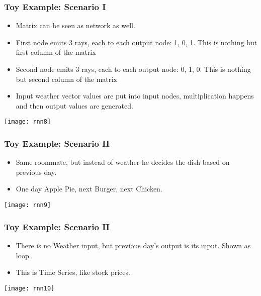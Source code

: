 \begin{frame}[fragile] \frametitle{Toy Example: Scenario I}
\begin{itemize}
\item Matrix can be seen as network as well.
\item First node emits 3 rays, each to each output node: 1, 0, 1. This is nothing but first column of the matrix
\item Second node emits 3 rays, each to each output node: 0, 1, 0. This is nothing but second column of the matrix
\item Input weather vector values are put into input nodes, multiplication happens and then output values are generated.
\end{itemize}
\begin{center}
\texttt{[image: rnn8]}
\end{center}
\end{frame}

\begin{frame}[fragile] \frametitle{Toy Example: Scenario II}

\begin{itemize}
\item Same roommate, but instead of weather he decides the dish based on previous day.
\item One day Apple Pie, next Burger, next Chicken.
\end{itemize}
\begin{center}
\texttt{[image: rnn9]}
\end{center}
\end{frame}

\begin{frame}[fragile] \frametitle{Toy Example: Scenario II}

\begin{itemize}
\item There is no Weather input, but previous day's output is its input. Shown as loop.
\item This is Time Series, like stock prices.
\end{itemize}
\begin{center}
\texttt{[image: rnn10]}
\end{center}
\end{frame}


